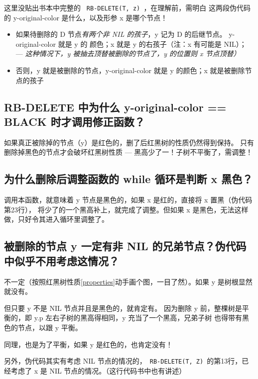 \documentclass[a4paper, 11pt]{article}
\begin{document}
这里没贴出书本中完整的 \verb| RB-DELETE(T, z) |，在理解前，需明白
这两段伪代码的 y-original-color 是什么，以及形参 x 是哪个节点！\par

\begin{itemize}

\item 如果待删除的 D 节点\emph{有两个非 NIL 的孩子}，y 记为 D 的后继节点。
y-original-color 就是 y 的 颜色；x 就是 y 的右孩子（注：x 有可能是 NIL）；
--- \emph{这种情况下，y 被抽去顶替被删除的节点了，y 的位置则 x 节点顶替）}

\item 否则，y 就是被删除的节点，y-original-color 就是 y 的颜色；x 就是被删除节点的孩子

\end{itemize}

\subsection{RB-DELETE 中为什么 y-original-color == BLACK 时才调用修正函数？}\label{sec:del:why}
如果真正被除掉的节点（y）是红色的，删了后红黑树的性质仍然得到保持。
只有删除掉黑色的节点才会破坏红黑树性质 --- 黑高少了一！子树不平衡了，需调整！

\subsection{为什么删除后调整函数的 while 循环是判断 x 黑色？}
调用本函数，就意味着 y 节点是黑色的，如果 x 是红的，直接将 x 置黑（伪代码第23行），
将少了的一个黑高补上，就完成了调整。但如果 x 是黑色，无法这样做，只好令其进入循环里调整了。

\subsection{被删除的节点 y 一定有非 NIL 的兄弟节点？伪代码中似乎不用考虑这情况？}
不一定（按照红黑树性质\ref{properties}动手画个图，一目了然）。如果 y 是树根显然就没有。 \par
但只要 y 不是 NIL 节点并且是黑色的，就肯定有。
因为删除 y 前，整棵树是平衡的，即 y.p 左右子树的黑高得相同，y 充当了一个黑高，兄弟子树
也得带有黑色的节点，以跟 y 平衡。\par 
同理，也是为了平衡，如果 y 是红色的，也肯定没有！\par

另外，伪代码其实有考虑 NIL 节点的情况的，\verb| RB-DELETE(T, Z) |的第13行，已经考虑了
x 是 NIL 节点的情况。（这行代码书中也有讲述）
\end{document}
